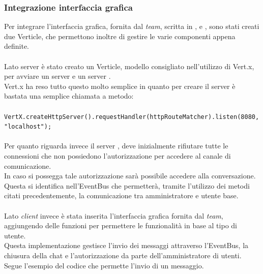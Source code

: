       \subsubsection*{Integrazione interfaccia grafica}
        Per integrare l'interfaccia grafica, fornita dal \textit{team}, scritta in ,  e , sono stati creati due Verticle, che permettono inoltre di gestire le varie componenti appena definite.\\\\
        Lato server è stato creato un Verticle, modello consigliato nell'utilizzo di Vert.x, per avviare un server  e un server .\\
        Vert.x ha reso tutto questo molto semplice in quanto per creare il server  è bastata una semplice chiamata a metodo:\\\\
        \verb|VertX.createHttpServer().requestHandler(httpRouteMatcher).listen(8080,"localhost");|\\\\
        Per quanto riguarda invece il server , deve inizialmente rifiutare tutte le connessioni che non possiedono l'autorizzazione per accedere al canale di comunicazione.\\
        In caso si possegga tale autorizzazione sarà possibile accedere alla conversazione.\\
        Questa si identifica nell'EventBus che permetterà, tramite l'utilizzo dei metodi citati precedentemente, la comunicazione tra amministratore e utente base.\\\\
        \newpage
        Lato \textit{client} invece è stata inserita l'interfaccia grafica fornita dal \textit{team}, aggiungendo delle funzioni  per permettere le funzionalità in base al tipo di utente.\\
        Questa implementazione gestisce l'invio dei messaggi attraverso l'EventBus, la chiusura della chat e l'autorizzazione da parte dell'amministratore di utenti.\\
        Segue l'esempio del codice che permette l'invio di un messaggio.\\
